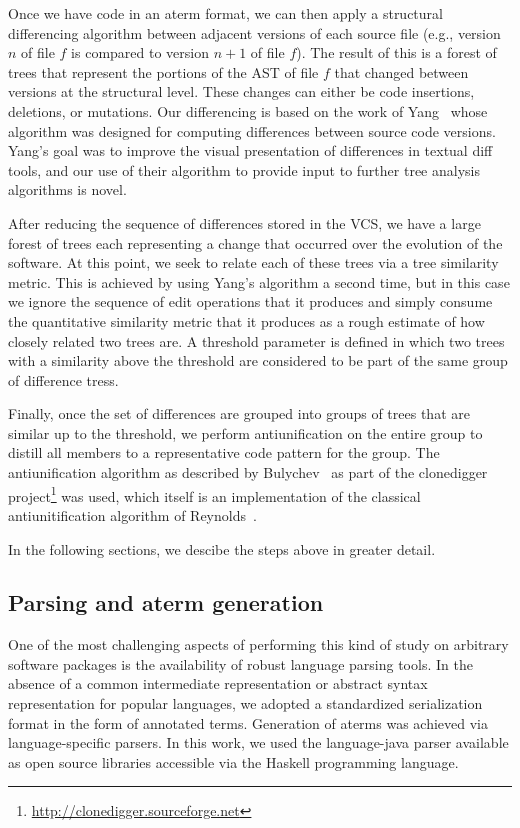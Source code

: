 Once we have code in an aterm format, we can then apply a structural
differencing algorithm between adjacent versions of each source file (e.g.,
version $n$ of file $f$ is compared to version $n+1$ of file $f$).  The result
of this is a forest of trees that represent the portions of the AST of file
$f$ that changed between versions at the structural level.  These changes can
either be code insertions, deletions, or mutations.  Our differencing is based
on the work of Yang~\cite{yang91diff} whose algorithm was designed for
computing differences between source code versions.  Yang's goal was to
improve the visual presentation of differences in textual diff tools, and our
use of their algorithm to provide input to further tree analysis algorithms is
novel.

After reducing the sequence of differences stored in the VCS, we have a large
forest of trees each representing a change that occurred over the evolution of
the software.  At this point, we seek to relate each of these trees via a
tree similarity metric.  This is achieved by using Yang's algorithm a second
time, but in this case we ignore the sequence of edit operations that it
produces and simply consume the quantitative similarity metric that it
produces as a rough estimate of how closely related two trees are.  A
threshold parameter is defined in which two trees with a similarity above the
threshold are considered to be part of the same group of difference tress.

Finally, once the set of differences are grouped into groups of trees that are
similar up to the threshold, we perform antiunification on the entire group to
distill all members to a representative code pattern for the group.  The
antiunification algorithm as described by Bulychev~\cite{bulychev08dupe} as
part of the clonedigger
project\footnote{\url{http://clonedigger.sourceforge.net}} was used, which
itself is an implementation of the classical antiunitification algorithm of
Reynolds~\cite{reynolds69antiunification}.

In the following sections, we descibe the steps above in greater detail.

\subsection{Parsing and aterm generation}

One of the most challenging aspects of performing this kind of study on
arbitrary software packages is the availability of robust language parsing
tools.  In the absence of a common intermediate representation or abstract
syntax representation for popular languages, we adopted a standardized
serialization format in the form of annotated terms.  Generation of aterms was
achieved via language-specific parsers.  In this work, we used the
language-java parser available as open source libraries accessible via the
Haskell programming language.


